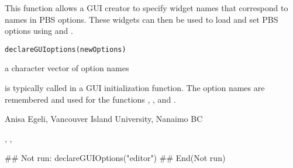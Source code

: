 \documentclass[letterpaper]{book}
\begin{document}
\begin{Description}\relax
This function allows a GUI creator to specify widget names that 
correspond to names in PBS options. These widgets can then be 
used to load and set PBS options using  and 
.
\end{Description}
\begin{Usage}
\begin{verbatim}
declareGUIoptions(newOptions)
\end{verbatim}
\end{Usage}
\begin{Arguments}
\begin{ldescription}
\item[\code{newOptions}] a character vector of option names
\end{ldescription}
\end{Arguments}
\begin{Details}\relax
{} is typically called in a GUI initialization function.
The option names are remembered and used for the functions 
, , and .
\end{Details}
\begin{Author}\relax
Anisa Egeli, Vancouver Island University, Nanaimo BC
\end{Author}
\begin{SeeAlso}\relax
{}, ,
\end{SeeAlso}
\begin{Examples}
\begin{ExampleCode}
## Not run: 
declareGUIOptions("editor")
## End(Not run)
\end{ExampleCode}
\end{Examples}
\end{document}

